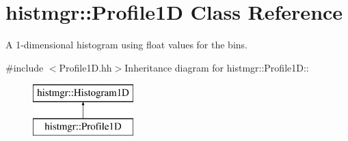 \section{histmgr::Profile1D Class Reference}
\label{classhistmgr_1_1Profile1D}


A 1-\/dimensional histogram using float values for the bins.  


{\ttfamily \#include $<$Profile1D.hh$>$}Inheritance diagram for histmgr::Profile1D::\begin{figure}[H]
\begin{center}
\leavevmode
\includegraphics[height=2cm]{classhistmgr_1_1Profile1D}
\end{center}
\end{figure}
